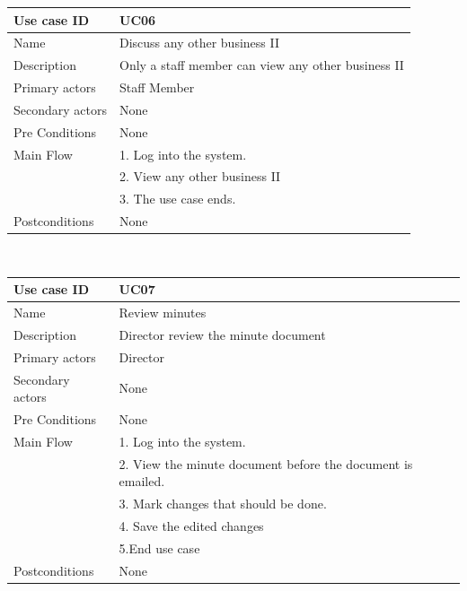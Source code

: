 \documentclass[a4paper,beamer]{article}
\begin{document}
			\begin{tabular}{|p{4cm}|p{8cm}|} \hline 
					\textbf{Use case ID} & \textbf{UC06}  \\ \hline
					Name & Discuss any other business II \\ \hline 
					Description & Only a staff member can view any other business II \\ \hline 
					Primary actors & Staff Member \\ \hline 
					Secondary actors & None \\ \hline 
					Pre Conditions & None \\ \hline
					Main Flow & 1. Log into the system.\\
										& 2. View any other business II \\
										& 3. The use case ends.\\ \hline
					Postconditions & None \\ \hline 
			\end{tabular} \\[.6cm]
			
			\begin{tabular}{|p{4cm}|p{8cm}|} \hline 
					\textbf{Use case ID} & \textbf{UC07}  \\ \hline
					Name & Review minutes \\ \hline 
					Description & Director review the minute document \\ \hline 
					Primary actors & Director \\ \hline 
					Secondary actors & None \\ \hline 
					Pre Conditions & None \\ \hline
					Main Flow & 1. Log into the system.\\
										& 2. View the minute document before the  document is emailed. \\
										& 3. Mark changes that should be done.\\
										& 4. Save the edited changes \\
										& 5.End use case \\ \hline
					Postconditions & None \\ \hline 
			\end{tabular} \\[.6cm]
			
\end{document}
